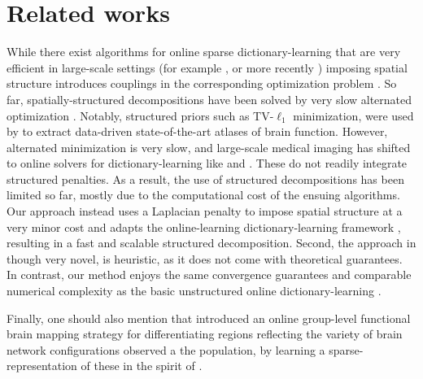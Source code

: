 \section{Related works}
While there exist algorithms for online sparse dictionary-learning
that are very efficient in large-scale settings (for example
  \citep{mairal2010}, or more recently   \citep{mensch2016dictionary})
imposing spatial structure introduces
couplings in the corresponding optimization problem   \citep{dohmatob2014benchmarking}. So far,
spatially-structured decompositions have been solved by very slow
alternated optimization   \citep{varoquaux2011,abraham2013}. Notably,
structured priors such as TV-$\ell_1$   \citep{baldassarre2012} minimization,
were used by   \citep{abraham2013} to extract data-driven
state-of-the-art atlases of brain function.
However, alternated minimization is very slow, and large-scale medical
imaging has shifted to online solvers for
dictionary-learning like   \citep{mairal2010} and   \citep{mensch2016dictionary}.
%
These do not readily
integrate structured penalties. As a result, the use of structured
decompositions has been limited so far, mostly due to the computational
cost of the ensuing algorithms. 
%
Our approach instead uses a Laplacian penalty to impose spatial
structure at a very minor cost and adapts the online-learning
dictionary-learning framework   \citep{mairal2010}, resulting in a fast
and scalable structured decomposition.
%
Second, the approach in   \citep{abraham2013} though very novel, is
heuristic, as it does not come with theoretical guarantees. In contrast, our
method enjoys the same convergence guarantees and comparable numerical
complexity as the basic unstructured online dictionary-learning
  \citep{mairal2010}.

Finally, one should also mention   \citep{varoquaux2013cohort} that introduced an online group-level functional brain mapping strategy for differentiating regions reflecting the variety of brain network configurations observed a
the population, by learning a sparse-representation of these in the spirit of   \citep{mairal2010}.

